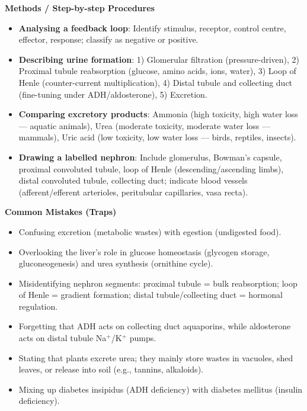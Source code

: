 \documentclass[11pt]{article}
\newcommand{\cle}[1]{{\popxbold\color{popdark}#1}}
\begin{document}
\begin{bilan}
\textbf{Methods / Step-by-step Procedures}
\begin{itemize}
\item \textbf{Analysing a feedback loop}: Identify stimulus, receptor, control centre, effector, response; classify as negative or positive.
\item \textbf{Describing urine formation}: 1) Glomerular filtration (pressure-driven), 2) Proximal tubule reabsorption (glucose, amino acids, ions, water), 3) Loop of Henle (counter-current multiplication), 4) Distal tubule and collecting duct (fine-tuning under ADH/aldosterone), 5) Excretion.
\item \textbf{Comparing excretory products}: Ammonia (high toxicity, high water loss — aquatic animals), Urea (moderate toxicity, moderate water loss — mammals), Uric acid (low toxicity, low water loss — birds, reptiles, insects).
\item \textbf{Drawing a labelled nephron}: Include glomerulus, Bowman's capsule, proximal convoluted tubule, loop of Henle (descending/ascending limbs), distal convoluted tubule, collecting duct; indicate blood vessels (afferent/efferent arterioles, peritubular capillaries, vasa recta).
\end{itemize}

\textbf{Common Mistakes (Traps)}
\begin{itemize}
\item Confusing \cle{excretion} (metabolic wastes) with \cle{egestion} (undigested food).
\item Overlooking the liver's role in glucose homeostasis (glycogen storage, gluconeogenesis) and urea synthesis (ornithine cycle).
\item Misidentifying nephron segments: proximal tubule = bulk reabsorption; loop of Henle = gradient formation; distal tubule/collecting duct = hormonal regulation.
\item Forgetting that ADH acts on collecting duct aquaporins, while aldosterone acts on distal tubule Na$^+$/K$^+$ pumps.
\item Stating that plants excrete urea; they mainly store wastes in vacuoles, shed leaves, or release into soil (e.g., tannins, alkaloids).
\item Mixing up diabetes insipidus (ADH deficiency) with diabetes mellitus (insulin deficiency).
\end{itemize}


\end{bilan}
\end{document}
